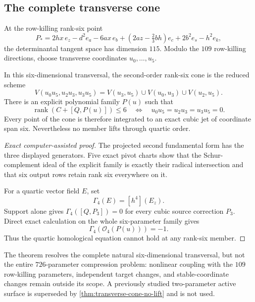 \subsection{The complete transverse cone}

At the row-killing rank-six point
\[
P_*=2hx\,e_z-d^2e_a-6ax\,e_b+
(2az-\tfrac23bh)e_c+2b^2e_s-h^2e_k,
\]
the determinantal tangent space has dimension \(115\).  Modulo the
\(109\) row-killing directions, choose transverse coordinates
\(u_0,\ldots,u_5\).

\begin{theorem}
\label{thm:transverse-cone-no-lift}
In this six-dimensional transversal, the second-order rank-six cone is the
reduced scheme
\[
V(u_0u_5,u_2u_3,u_3u_5)
=
V(u_3,u_5)\cup V(u_0,u_3)\cup V(u_2,u_5).
\]
There is an explicit polynomial family \(P(u)\) such that
\[
\operatorname{rank}(C+[Q,P(u)])\le6
\quad\Longleftrightarrow\quad
u_0u_5=u_2u_3=u_3u_5=0.
\]
Every point of the cone is therefore integrated to an exact cubic jet of
coordinate span six.  Nevertheless no member lifts through quartic order.
\end{theorem}

\begin{proof}[Exact computer-assisted proof]
The projected second fundamental form has the three displayed generators.
Five exact pivot charts show that the Schur-complement ideal of the explicit
family is exactly their radical intersection and that six output rows retain
rank six everywhere on it.

For a quartic vector field \(E\), set
\[
\Gamma_4(E)=[h^4](E_z).
\]
Support alone gives \(\Gamma_4([Q,P_3])=0\) for every cubic source
correction \(P_3\).  Direct exact calculation on the whole six-parameter
family gives
\[
\Gamma_4(\mathcal O_4(P(u)))=-1.
\]
Thus the quartic homological equation cannot hold at any rank-six member.
\end{proof}

The theorem resolves the complete natural six-dimensional transversal, but
not the entire \(726\)-parameter compression problem: nonlinear coupling
with the \(109\) row-killing parameters, independent target changes, and
stable-coordinate changes remain outside its scope.  A previously studied
two-parameter active surface is superseded by
\cref{thm:transverse-cone-no-lift} and is not used.
